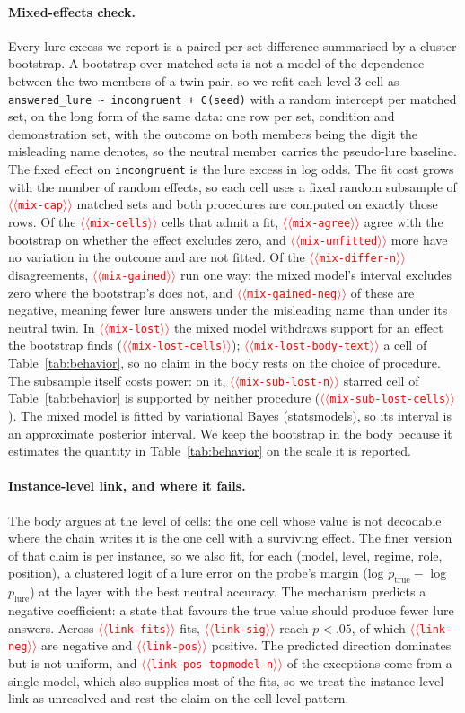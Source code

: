 \documentclass[11pt]{article}
\providecommand{\NUM}[1]{\textcolor{red}{$\langle\langle$\texttt{#1}$\rangle\rangle$}}
\begin{document}
\paragraph{Mixed-effects check.} Every lure excess we report is a paired per-set difference
summarised by a cluster bootstrap. A bootstrap over matched sets is not a model of the
dependence between the two members of a twin pair, so we refit each level-3 cell as
\texttt{answered\_lure \textasciitilde{} incongruent + C(seed)} with a random intercept per
matched set, on the long form of the same data: one row per set, condition and demonstration
set, with the outcome on both members being the digit the misleading name denotes, so the
neutral member carries the pseudo-lure baseline. The fixed effect on \texttt{incongruent} is
the lure excess in log odds. The fit
cost grows with the number of random effects, so each cell uses a fixed random subsample of
\NUM{mix-cap} matched sets and both procedures are computed on exactly those rows. Of the
\NUM{mix-cells} cells that admit a fit, \NUM{mix-agree} agree with the bootstrap on whether
the effect excludes zero, and \NUM{mix-unfitted} more have no variation in the outcome and are
not fitted. Of the \NUM{mix-differ-n} disagreements, \NUM{mix-gained} run one way: the mixed
model's interval excludes zero where the bootstrap's does not, and \NUM{mix-gained-neg} of these
are negative, meaning fewer lure answers under the misleading name than under its neutral twin.
In \NUM{mix-lost} the mixed model withdraws support for an effect the bootstrap finds
(\NUM{mix-lost-cells}); \NUM{mix-lost-body-text} a cell of Table~\ref{tab:behavior}, so
no claim in the body rests on the choice of procedure. The subsample itself costs power: on it,
\NUM{mix-sub-lost-n} starred cell of Table~\ref{tab:behavior} is supported by neither procedure
(\NUM{mix-sub-lost-cells}). The mixed model is fitted by variational Bayes (statsmodels), so its
interval is an approximate posterior interval. We keep the bootstrap in the
body because it estimates the quantity in Table~\ref{tab:behavior} on the scale it is
reported.

\paragraph{Instance-level link, and where it fails.} The body argues at the level of cells:
the one cell whose value is not decodable where the chain writes it is the one cell with a
surviving effect. The finer version of that claim is per instance, so we also fit, for each
(model, level, regime, role, position), a clustered logit of a lure error on the probe's margin
(log $p_{\text{true}} -$ log $p_{\text{lure}}$) at the layer with the best neutral accuracy.
The mechanism predicts a negative coefficient: a state that favours the true value should
produce fewer lure answers. Across \NUM{link-fits} fits, \NUM{link-sig} reach $p < .05$, of
which \NUM{link-neg} are negative and \NUM{link-pos} positive. The predicted direction
dominates but is not uniform, and \NUM{link-pos-topmodel-n} of the exceptions come from a
single model, which also supplies most of the fits, so we treat the instance-level link as unresolved and rest the claim on the
cell-level pattern.
\end{document}
